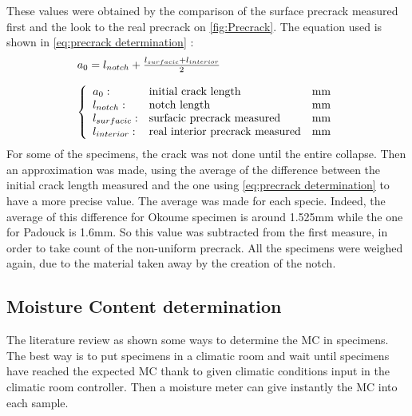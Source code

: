 These values were obtained by the comparison of the surface precrack measured first and the look to the real precrack on \ref{fig:Precrack}. The equation used is shown in \ref{eq:precrack determination} :
\begin{equation}
	\centering
	\begin{array}{l}
		a_{0}= l_{notch} + \frac{l_{surfacic}+l_{interior}}{2}
		\\
		\\
		\left\{
		\begin{array}{llll}
			a_{0}: & $initial crack length$ & \si{\milli\meter} \\
			l_{notch}: & $notch length$ & \si{\milli\meter} \\
			l_{surfacic}: & $surfacic precrack measured$ & \si{\milli\meter} \\ 
			l_{interior}: & $real interior precrack measured$ & \si{\milli\meter} \\
		\end{array}
		\right.
	\end{array}
	\label{eq:precrack determination}
\end{equation} 
For some of the specimens, the crack was not done until the entire collapse. Then an approximation was made, using the average of the difference between the initial crack length measured and the one using \ref{eq:precrack determination} to have a more precise value. The average was made for each specie. Indeed, the average of this difference for Okoume specimen is around 1.525\si{\milli\meter} while the one for Padouck is 1.6\si{\milli\meter}. So this value was subtracted from the first measure, in order to take count of the non-uniform precrack.
All the specimens were weighed again, due to the material taken away by the creation of the notch.

\subsection{Moisture Content determination}

The literature review as shown some ways to determine the MC in specimens. The best way is to put specimens in a climatic room and wait until specimens have reached the expected MC thank to given climatic conditions input in the climatic room controller. Then a moisture meter can give instantly the MC into each sample. 

